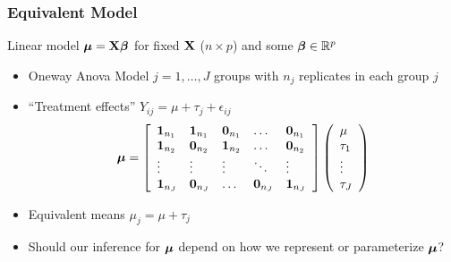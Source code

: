 \documentclass{beamer}
\begin{document}
\begin{frame}
  \frametitle{Equivalent Model}
Linear model $\boldsymbol{\mu} = \mathbf{X} \boldsymbol{\beta}$ for fixed $\mathbf{X}$ ($n \times p$) and some $\boldsymbol{\beta}
\in \mathbb{R}^p$    \pause

\begin{itemize}
\item  Oneway Anova Model  $j = 1, \ldots, J$ groups with $n_j$
  replicates in each group $j$ \pause
\item 
{``Treatment effects'' $Y_{ij} = \mu + \tau_j + \epsilon_{ij}$}
 $$ \boldsymbol{\mu} = {\left[
  \begin{array}{lllll}
  \mathbf{1}_{n_1} &  \mathbf{1}_{n_1} & \mathbf{0}_{n_1} & \ldots & \mathbf{0}_{n_1} \\
    \mathbf{1}_{n_2} &  \mathbf{0}_{n_2} & \mathbf{1}_{n_2} & \ldots & \mathbf{0}_{n_2} \\
  \vdots &    \vdots & \vdots & \ddots & \vdots \\
  \mathbf{1}_{n_J} & \mathbf{0}_{n_J} & \ldots & \mathbf{0}_{n_J} & \mathbf{1}_{n_J} \\
  \end{array}
   \right] \left(
     \begin{array}{l}
\mu \\ \tau_1 \\ \vdots \\ \tau_J 
    \end{array}
\right)}
$$
 \pause
\item Equivalent means $\mu_j = \mu + \tau_j$
\item  Should our inference for $\boldsymbol{\mu}$ depend on how we represent or
  parameterize $\boldsymbol{\mu}$?
\end{itemize}

\end{frame}
\end{document}
